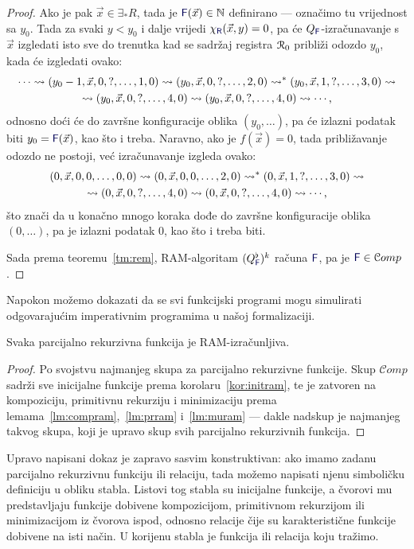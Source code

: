 \begin{proof}
Ako je pak $\vec x\in\exists_*R$, tada je $\f F(\vec x)\in\N$ definirano --- označimo tu vrijednost sa $y_0$. Tada za svaki $y<y_0$ i dalje vrijedi $\chi_{\f R}(\vec x,y)=0$, pa će $Q_{\f F}$-izračunavanje s $\vec x$ izgledati isto sve do trenutka kad se sadržaj registra $\mathcal R_{0}$ približi odozdo $y_0$, kada će izgledati ovako:
\begin{multline}
    \dotsb\leadsto(y_0-1,\vec x,0,?,\dotsc,1,0)\leadsto
    (y_0,\vec x,0,?,\dotsc,2,0)\leadsto^*
    (y_0,\vec x,1,?,\dotsc,3,0)\leadsto\\
    \leadsto(y_0,\vec x,0,?,\dotsc,4,0)\leadsto
    (y_0,\vec x,0,?,\dotsc,4,0)\leadsto\dotsb\text,
\end{multline}
odnosno doći će do završne konfiguracije oblika $(y_0,\dotsc)$, pa će izlazni podatak biti $y_0=\f F(\vec x)$, kao što i treba. Naravno, ako je $f(\vec x)=0$, tada približavanje odozdo ne postoji, već izračunavanje izgleda ovako:
\begin{multline}
    (0,\vec x,0,0,\dotsc,0,0)\leadsto
    (0,\vec x,0,0,\dotsc,2,0)\leadsto^*
    (0,\vec x,1,?,\dotsc,3,0)\leadsto\\
    \leadsto(0,\vec x,0,?,\dotsc,4,0)
    \leadsto(0,\vec x,0,?,\dotsc,4,0)\leadsto\dotsb\text,
\end{multline}
što znači da u konačno mnogo koraka dođe do završne konfiguracije oblika $(0,\dotsc)$, pa je izlazni podatak $0$, kao što i treba biti.

Sada prema teoremu~\ref{tm:rem}, RAM-algoritam $(Q_{\f F}^\flat)^k$ računa $\f F$, pa je $\f F\in\mathcal Comp$.
\end{proof}

Napokon možemo dokazati da se svi funkcijski programi mogu simulirati odgovarajućim imperativnim programima u našoj formalizaciji.

\begin{teorem}\label{tm:pir}
Svaka parcijalno rekurzivna funkcija je RAM-izračunljiva.
\end{teorem}
\begin{proof}
Po svojstvu najmanjeg skupa za parcijalno rekurzivne funkcije. Skup $\mathcal Comp$ sadrži sve inicijalne funkcije prema korolaru~\ref{kor:initram}, te je zatvoren na kompoziciju, primitivnu rekurziju i minimizaciju prema lemama~\ref{lm:compram},~\ref{lm:prram} i~\ref{lm:muram} --- dakle nadskup je najmanjeg takvog skupa, koji je upravo skup svih parcijalno rekurzivnih funkcija.
\end{proof}

Upravo napisani dokaz je zapravo sasvim konstruktivan: ako imamo zadanu parcijalno rekurzivnu funkciju ili relaciju, tada možemo napisati njenu simboličku definiciju u obliku stabla. Listovi tog stabla su inicijalne funkcije, a čvorovi mu predstavljaju funkcije dobivene kompozicijom, primitivnom rekurzijom ili minimizacijom iz čvorova ispod, odnosno relacije čije su karakteristične funkcije dobivene na isti način. U korijenu stabla je funkcija ili relacija koju tražimo.

